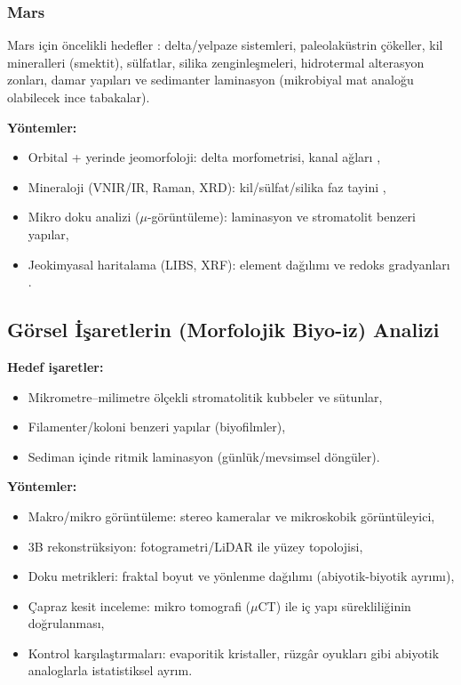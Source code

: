 \documentclass[12pt,a4paper]{article}
\begin{document}
\subsubsection*{Mars}
Mars için öncelikli hedefler \cite{farley2020}: delta/yelpaze sistemleri, paleolaküstrin çökeller, kil mineralleri (smektit), sülfatlar, silika zenginleşmeleri, hidrotermal alterasyon zonları, damar yapıları ve sedimanter laminasyon (mikrobiyal mat analoğu olabilecek ince tabakalar).

\textbf{Yöntemler:}
\begin{itemize}
    \item Orbital + yerinde jeomorfoloji: delta morfometrisi, kanal ağları \cite{mcewen2007, murchie2007},
    \item Mineraloji (VNIR/IR, Raman, XRD): kil/sülfat/silika faz tayini \cite{bhartia2021, maurice2021},
    \item Mikro doku analizi ($\mu$-görüntüleme): laminasyon ve stromatolit benzeri yapılar,
    \item Jeokimyasal haritalama (LIBS, XRF): element dağılımı ve redoks gradyanları \cite{allwood2020}.
\end{itemize}

\subsection{Görsel İşaretlerin (Morfolojik Biyo-iz) Analizi}

\textbf{Hedef işaretler:}
\begin{itemize}
    \item Mikrometre--milimetre ölçekli stromatolitik kubbeler ve sütunlar,
    \item Filamenter/koloni benzeri yapılar (biyofilmler),
    \item Sediman içinde ritmik laminasyon (günlük/mevsimsel döngüler).
\end{itemize}

\textbf{Yöntemler:}
\begin{itemize}
    \item Makro/mikro görüntüleme: stereo kameralar ve mikroskobik görüntüleyici,
    \item 3B rekonstrüksiyon: fotogrametri/LiDAR ile yüzey topolojisi,
    \item Doku metrikleri: fraktal boyut ve yönlenme dağılımı (abiyotik-biyotik ayrımı),
    \item Çapraz kesit inceleme: mikro tomografi ($\mu$CT) ile iç yapı sürekliliğinin doğrulanması,
    \item Kontrol karşılaştırmaları: evaporitik kristaller, rüzg\^ar oyukları gibi abiyotik analoglarla istatistiksel ayrım.
\end{itemize}
\end{document}

